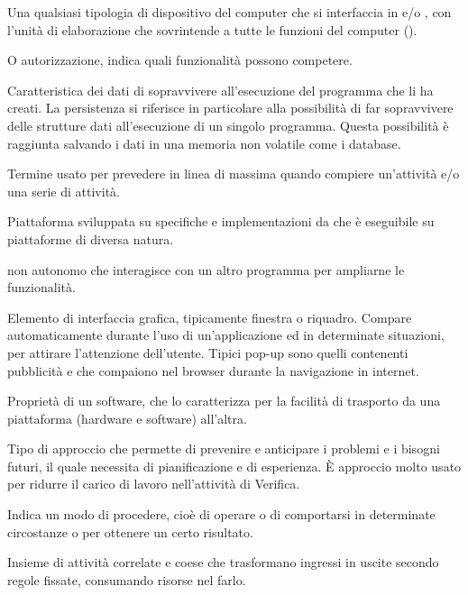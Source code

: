 {Una qualsiasi tipologia di dispositivo  del computer che si interfaccia in  e/o , con l'unità di elaborazione che sovrintende a tutte le funzioni del computer ().}

{O autorizzazione, indica quali funzionalità possono competere.}

{Caratteristica dei dati di sopravvivere all'esecuzione del programma che li ha creati. La persistenza si riferisce in particolare alla possibilità di far sopravvivere delle strutture dati all'esecuzione di un singolo programma. Questa possibilità è raggiunta salvando i dati in una memoria non volatile come i database.}

{Termine usato per prevedere in linea di massima quando compiere un'attività e/o una serie di attività.}

{Piattaforma  sviluppata su specifiche e implementazioni da  che è eseguibile su piattaforme  di diversa natura.}

{ non autonomo che interagisce con un altro programma per ampliarne le funzionalità.}

{Elemento di interfaccia grafica, tipicamente finestra o riquadro. Compare automaticamente durante l'uso di un'applicazione ed in determinate situazioni, per attirare l'attenzione dell'utente. Tipici pop-up sono quelli contenenti pubblicità e che compaiono nel browser durante la navigazione in internet.}

{Proprietà di un software, che lo caratterizza per la facilità di trasporto da una piattaforma (hardware e software) all'altra.}

{Tipo di approccio che permette di prevenire e anticipare i problemi e i bisogni futuri, il quale necessita di pianificazione e di esperienza. \`{E} approccio molto usato per ridurre il carico di lavoro nell'attività di Verifica.}

{Indica un modo di procedere, cioè di operare o di comportarsi in determinate circostanze o per ottenere un certo risultato.}

{Insieme di attività correlate e coese che trasformano ingressi in uscite secondo regole fissate, consumando risorse nel farlo.}

